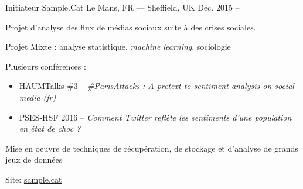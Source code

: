 \begin{cventries}
  \cventry
    {Initiateur} %
    {Sample.Cat} %
		{Le Mans, FR --- Sheffield, UK} %
    {Déc. 2015 --} %
    {
      \begin{cvitems} %
        \item {Projet d'analyse des flux de médias sociaux suite à des crises sociales.}
				\item {Projet Mixte : analyse statistique, \textit{machine learning}, sociologie}
				\item {Plusieurs conférences :\begin{itemize}
						\item HAUMTalks \#3 -- \textit{\#ParisAttacks : A pretext to sentiment analysis on social media (fr)}
						\item PSES-HSF 2016 -- \textit{Comment Twitter reflète les sentiments d'une population en état de choc ?}
				\end{itemize}}
				\item {Mise en oeuvre de techniques de récupération, de stockage et d'analyse de grands jeux de données}
				\item {Site: \href{https://sample.cat}{sample.cat}}
      \end{cvitems}
    }

\end{cventries}
